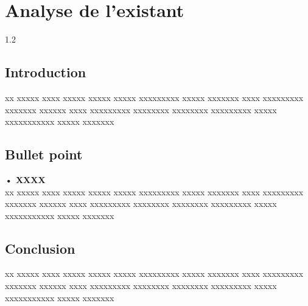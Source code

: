 \chapter{Analyse de l'existant}
\begin{spacing}{1.2}
\minitoc
\thispagestyle{MyStyle}
\end{spacing}
\newpage

\section{Introduction}
xx xxxxx xxxx xxxxx xxxxx xxxxx xxxxxxxxx xxxxx xxxxxxx xxxx xxxxxxxxx xxxxxxx xxxxxx xxxx xxxxxxxxx xxxxxxxx xxxxxxxx xxxxxxxxx xxxxx xxxxxxxxxxx xxxxx xxxxxxx 


\section{Bullet point}

\textbf{•\hspace{0.5cm} XXXX}\\
xx xxxxx xxxx xxxxx xxxxx xxxxx xxxxxxxxx xxxxx xxxxxxx xxxx xxxxxxxxx xxxxxxx xxxxxx xxxx xxxxxxxxx xxxxxxxx xxxxxxxx xxxxxxxxx xxxxx xxxxxxxxxxx xxxxx xxxxxxx 

\section{Conclusion}
xx xxxxx xxxx xxxxx xxxxx xxxxx xxxxxxxxx xxxxx xxxxxxx xxxx xxxxxxxxx xxxxxxx xxxxxx xxxx xxxxxxxxx xxxxxxxx xxxxxxxx xxxxxxxxx xxxxx xxxxxxxxxxx xxxxx xxxxxxx 




